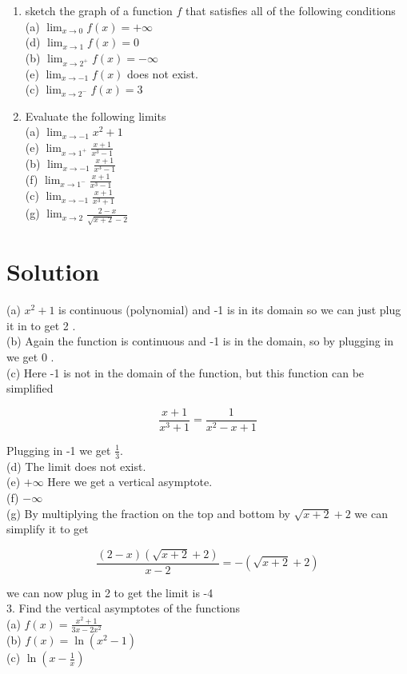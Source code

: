 \documentclass[10pt]{article}
\begin{document}
\begin{enumerate}
  \item sketch the graph of a function $f$ that satisfies all of the following conditions\\
(a) $\lim _{x \rightarrow 0} f(x)=+\infty$\\
(d) $\lim _{x \rightarrow 1} f(x)=0$\\
(b) $\lim _{x \rightarrow 2^{+}} f(x)=-\infty$\\
(e) $\lim _{x \rightarrow-1} f(x)$ does not exist.\\
(c) $\lim _{x \rightarrow 2^{-}} f(x)=3$
  \item Evaluate the following limits\\
(a) $\lim _{x \rightarrow-1} x^{2}+1$\\
(e) $\lim _{x \rightarrow 1^{+}} \frac{x+1}{x^{3}-1}$\\
(b) $\lim _{x \rightarrow-1} \frac{x+1}{x^{3}-1}$\\
(f) $\lim _{x \rightarrow 1^{-}} \frac{x+1}{x^{3}-1}$\\
(c) $\lim _{x \rightarrow-1} \frac{x+1}{x^{3}+1}$\\
(g) $\lim _{x \rightarrow 2} \frac{2-x}{\sqrt{x+2}-2}$
\end{enumerate}

\section*{Solution}
(a) $x^{2}+1$ is continuous (polynomial) and -1 is in its domain so we can just plug it in to get 2 .\\
(b) Again the function is continuous and -1 is in the domain, so by plugging in we get 0 .\\
(c) Here -1 is not in the domain of the function, but this function can be simplified

$$
\frac{x+1}{x^{3}+1}=\frac{1}{x^{2}-x+1}
$$

Plugging in -1 we get $\frac{1}{3}$.\\
(d) The limit does not exist.\\
(e) $+\infty$ Here we get a vertical asymptote.\\
(f) $-\infty$\\
(g) By multiplying the fraction on the top and bottom by $\sqrt{x+2}+2$ we can simplify it to get

$$
\frac{(2-x)(\sqrt{x+2}+2)}{x-2}=-(\sqrt{x+2}+2)
$$

we can now plug in 2 to get the limit is -4\\
3. Find the vertical asymptotes of the functions\\
(a) $f(x)=\frac{x^{2}+1}{3 x-2 x^{2}}$\\
(b) $f(x)=\ln \left(x^{2}-1\right)$\\
(c) $\ln \left(x-\frac{1}{x}\right)$
\end{document}
